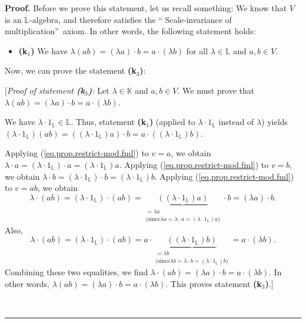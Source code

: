 \documentclass[numbers=enddot,12pt,final,onecolumn,notitlepage]{scrartcl}%
\theoremstyle{definition}
\newenvironment{fineprint}{\begin{small}}{\end{small}}
\newenvironment{proof}[1][Proof]{\noindent\textbf{#1.} }{\ \rule{0.5em}{0.5em}}
\begin{document}
\begin{fineprint}
\begin{proof}
Before we prove this statement, let us recall something: We know that $V$ is
an $\mathbb{L}$-algebra, and therefore satisfies the \textquotedblleft
Scale-invariance of multiplication\textquotedblright\ axiom. In other words,
the following statement holds:

\begin{itemize}
\item \textbf{(k}$_{1}$\textbf{)} We have $\lambda\left(  ab\right)  =\left(
\lambda a\right)  \cdot b=a\cdot\left(  \lambda b\right)  $ for all
$\lambda\in\mathbb{L}$ and $a,b\in V$.
\end{itemize}

Now, we can prove the statement \textbf{(k}$_{3}$\textbf{)}:

[\textit{Proof of statement \textbf{(k}}$_{3}$\textit{\textbf{)}:} Let
$\lambda\in\mathbb{K}$ and $a,b\in V$. We must prove that $\lambda\left(
ab\right)  =\left(  \lambda a\right)  \cdot b=a\cdot\left(  \lambda b\right)
$.

We have $\lambda\cdot1_{\mathbb{L}}\in\mathbb{L}$. Thus, statement
\textbf{(k}$_{1}$\textbf{)} (applied to $\lambda\cdot1_{\mathbb{L}}$ instead
of $\lambda$) yields $\left(  \lambda\cdot1_{\mathbb{L}}\right)  \left(
ab\right)  =\left(  \left(  \lambda\cdot1_{\mathbb{L}}\right)  a\right)  \cdot
b=a\cdot\left(  \left(  \lambda\cdot1_{\mathbb{L}}\right)  b\right)  $.

Applying (\ref{eq.prop.restrict-mod.fml}) to $v=a$, we obtain $\lambda\cdot
a=\left(  \lambda\cdot1_{\mathbb{L}}\right)  \cdot a=\left(  \lambda
\cdot1_{\mathbb{L}}\right)  a$. Applying (\ref{eq.prop.restrict-mod.fml}) to
$v=b$, we obtain $\lambda\cdot b=\left(  \lambda\cdot1_{\mathbb{L}}\right)
\cdot b=\left(  \lambda\cdot1_{\mathbb{L}}\right)  b$. Applying
(\ref{eq.prop.restrict-mod.fml}) to $v=ab$, we obtain
\[
\lambda\cdot\left(  ab\right)  =\left(  \lambda\cdot1_{\mathbb{L}}\right)
\cdot\left(  ab\right)  =\underbrace{\left(  \left(  \lambda\cdot
1_{\mathbb{L}}\right)  a\right)  }_{\substack{=\lambda a\\\text{(since
}\lambda a=\lambda\cdot a=\left(  \lambda\cdot1_{\mathbb{L}}\right)
a\text{)}}}\cdot b=\left(  \lambda a\right)  \cdot b.
\]
Also,%
\[
\lambda\cdot\left(  ab\right)  =\left(  \lambda\cdot1_{\mathbb{L}}\right)
\cdot\left(  ab\right)  =a\cdot\underbrace{\left(  \left(  \lambda
\cdot1_{\mathbb{L}}\right)  b\right)  }_{\substack{=\lambda b\\\text{(since
}\lambda b=\lambda\cdot b=\left(  \lambda\cdot1_{\mathbb{L}}\right)
b\text{)}}}=a\cdot\left(  \lambda b\right)  .
\]
Combining these two equalities, we find $\lambda\cdot\left(  ab\right)
=\left(  \lambda a\right)  \cdot b=a\cdot\left(  \lambda b\right)  $. In other
words, $\lambda\left(  ab\right)  =\left(  \lambda a\right)  \cdot
b=a\cdot\left(  \lambda b\right)  $. This proves statement \textbf{(k}$_{3}%
$\textbf{)}.]


\end{proof}
\end{fineprint}
\end{document}
